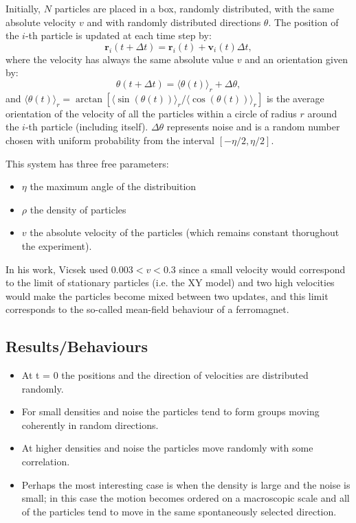 \documentclass[a4paper]{article}
\begin{document}
Initially, $N$ particles are placed in a box, randomly distributed, with the same absolute velocity $v$ and with randomly distributed directions $\theta$. The position of the $i$-th particle is updated at each time step by:
%
\begin{equation}
	\mathbf{r}_i(t+\Delta t) = \mathbf{r}_i(t) + \mathbf{v}_i(t)\Delta t,	
\end{equation}
%
where the velocity has always the same absolute value $v$ and an orientation given by:
%
\begin{equation}
	\theta(t+\Delta t) = \langle\theta(t)\rangle_r + \Delta \theta,
\end{equation}
%
and $\langle \theta(t)\rangle_r = \arctan[\langle \sin(\theta(t))\rangle_r /\langle \cos(\theta(t))\rangle _r ]$ is the average orientation of the velocity of all the particles within a circle of radius $r$ around the $i$-th particle (including itself). $\Delta \theta$ represents noise and is a random number chosen with uniform probability from the interval $[-\eta/2,\eta/2]$.

This system has three free parameters:
%
\begin{itemize}
	\item $\eta$ the maximum angle of the distribuition
	\item $\rho$ the density of particles
	\item $v$ the absolute velocity of the particles (which remains constant thorughout the experiment).
\end{itemize}
%
In his work, Vicsek used $0.003<v<0.3$ since a small velocity would correspond to the limit of stationary particles (i.e. the XY model) and two high velocities would make the particles become mixed between two updates, and this limit corresponds to the so-called mean-field behaviour of a ferromagnet.

\subsection{Results/Behaviours}

\begin{itemize}
	\item At t = 0 the positions and the direction of velocities are distributed randomly.
	\item For small densities and noise the particles tend to form groups moving coherently in random directions.
	\item At higher densities and noise the particles move randomly with some correlation. 
	\item Perhaps the most interesting case is when the density is large and
 the noise is small; in this case the motion becomes ordered on a macroscopic scale and all of the particles tend to move in the same spontaneously selected direction.
\end{itemize}
\end{document}
